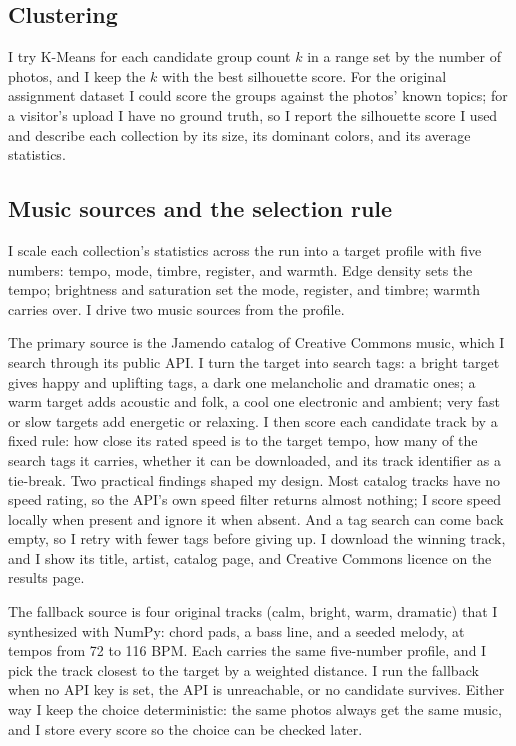 \documentclass[conference]{IEEEtran}
\begin{document}
\subsection{Clustering}
I try K-Means for each candidate group count $k$ in a range set by
the number of photos, and I keep the $k$ with the best silhouette
score. For the original assignment dataset I could score the
groups against the photos' known topics; for a visitor's upload I
have no ground truth, so I report the silhouette score I used and
describe each collection by its size, its dominant colors, and its
average statistics.

\subsection{Music sources and the selection rule}
I scale each collection's statistics across the run into a target
profile with five numbers: tempo, mode, timbre, register, and
warmth. Edge density sets the tempo; brightness and saturation set
the mode, register, and timbre; warmth carries over. I drive two
music sources from the profile.

The primary source is the Jamendo catalog of Creative Commons
music, which I search through its public API. I turn the target
into search tags: a bright target gives happy and uplifting tags,
a dark one melancholic and dramatic ones; a warm target adds
acoustic and folk, a cool one electronic and ambient; very fast or
slow targets add energetic or relaxing. I then score each
candidate track by a fixed rule: how close its rated speed is to
the target tempo, how many of the search tags it carries, whether
it can be downloaded, and its track identifier as a tie-break. Two
practical findings shaped my design. Most catalog tracks have no
speed rating, so the API's own speed filter returns almost
nothing; I score speed locally when present and ignore it when
absent. And a tag search can come back empty, so I retry with
fewer tags before giving up. I download the winning track, and I
show its title, artist, catalog page, and Creative Commons licence
on the results page.

The fallback source is four original tracks (calm, bright, warm,
dramatic) that I synthesized with NumPy: chord pads, a bass line,
and a seeded melody, at tempos from 72 to 116 BPM. Each carries
the same five-number profile, and I pick the track closest to the
target by a weighted distance. I run the fallback when no API key
is set, the API is unreachable, or no candidate survives. Either
way I keep the choice deterministic: the same photos always get
the same music, and I store every score so the choice can be
checked later.
\end{document}

